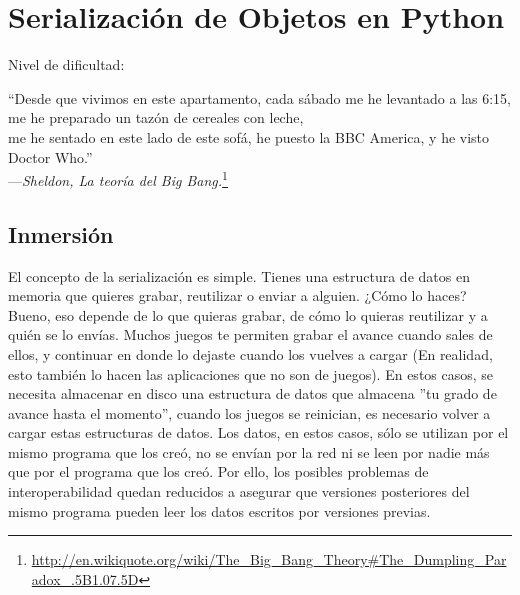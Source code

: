 
\chapter{Serialización de Objetos en Python}\label{ch:serializacion}

\noindent
Nivel de dificultad:\difllll

\begin{citaCap}
``Desde que vivimos en este apartamento, cada sábado me he levantado a las 6:15, \\
me he preparado un tazón de cereales con leche, \\
me he sentado en este lado de este sofá, he puesto la BBC America, 
y he visto Doctor Who.'' \\
---\emph{Sheldon, La teoría del Big Bang.}\footnote{\href{http://en.wikiquote.org/wiki/The\_Big\_Bang\_Theory\#The\_Dumpling\_Paradox\_.5B1.07.5D}{http://en.wikiquote.org/wiki/The\_Big\_Bang\_Theory\#The\_Dumpling\_Paradox\_.5B1.07.5D}}
\end{citaCap}

\section{Inmersión}

El concepto de la serialización es simple. Tienes una estructura de datos en memoria que quieres grabar, reutilizar o enviar a alguien. ¿Cómo lo haces? Bueno, eso depende de lo que quieras grabar, de cómo lo quieras reutilizar y a quién se lo envías. Muchos juegos te permiten grabar el avance cuando sales de ellos, y continuar en donde lo dejaste cuando los vuelves a cargar (En realidad, esto también lo hacen las aplicaciones que no son de juegos). En estos casos, se necesita almacenar en disco una estructura de datos que almacena ''tu grado de avance hasta el momento'', cuando los juegos se reinician, es necesario volver a cargar estas estructuras de datos. Los datos, en estos casos, sólo se utilizan por el mismo programa que los creó, no se envían por la red ni se leen por nadie más que por el programa que los creó. Por ello, los posibles problemas de interoperabilidad quedan reducidos a asegurar que versiones posteriores del mismo programa pueden leer los datos escritos por versiones previas.

